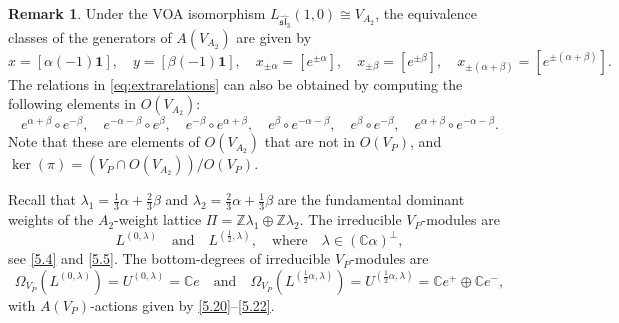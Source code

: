 \documentclass[12pt,a4paper,reqno]{amsart}
\numberwithin{equation}{section}
\numberwithin{equation}{section}
\theoremstyle{definition}
\newtheorem{remark}[thm]{Remark}
\newcommand{\Z}{\mathbb{Z}}
\def \C {\mathbb{C}}
\def\la{\lambda}
\def \al{\alpha}
\def \b {\beta}
\def \op {\oplus}
\def \vac {\mathbf{1}}
\def\Om{\Omega}
\def\<{\langle}
\def\>{\rangle}
\def\sl{\mathfrak{sl}}
\begin{document}
	\begin{remark}
		Under the VOA isomorphism $L_{\widehat{\sl_3}}(1,0)\cong V_{A_2}$, the equivalence classes of the generators of $A(V_{A_2})$ are given by
		\[
		x = [\al(-1)\vac],\quad 
		y = [\b(-1)\vac],\quad 
		x_{\pm \al} = [e^{\pm \al}],\quad 
		x_{\pm \b} = [e^{\pm \b}],\quad 
		x_{\pm (\al+\b)} = [e^{\pm (\al+\b)}].
		\]
		The relations in \eqref{eq:extrarelations} can also be obtained by computing the following elements in $O(V_{A_2})$:
		\[
		e^{\al+\b}\circ e^{-\b},\quad 
		e^{-\al-\b}\circ e^{\b},\quad 
		e^{-\b}\circ e^{\al+\b},\quad 
		e^{\b}\circ e^{-\al-\b},\quad 
		e^{\b}\circ e^{-\b},\quad 
		e^{\al+\b}\circ e^{-\al-\b}.
		\]
		Note that these are elements of $O(V_{A_2})$ that are not in $O(V_P)$, and
		$
		\ker(\pi) = (V_P \cap O(V_{A_2}))/O(V_P).
		$
	\end{remark}
	
	
	
	
	
	
	
	Recall that $\la_1=\frac{1}{3}\al+\frac{2}{3}\b$ and $\la_2=\frac{2}{3}\al+\frac{1}{3}\b$ are the fundamental dominant weights of the $A_2$-weight lattice $\Pi=\Z\la_1\op \Z \la_2$. The irreducible $V_P$-modules are 
	$$L^{(0,\la)}\quad \mathrm{and}\quad L^{(\frac{1}{2},\la)},\quad \mathrm{where}\quad \la\in (\C\al)^\perp,$$ 
	see \eqref{5.4} and \eqref{5.5}. The bottom-degrees of irreducible $V_P$-modules are
	$$\Om_{V_P}(L^{(0,\la)})=	U^{(0,\la)}=\C e\quad \mathrm{and}\quad \Om_{V_P}(L^{(\frac{1}{2}\al,\la)})=U^{(\frac{1}{2}\al,\la)}=\C e^+\op\C e^-,$$
	with $A(V_P)$-actions given by \eqref{5.20}--\eqref{5.22}. 
	
\end{document}
